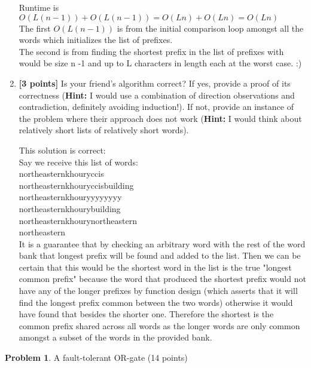 \documentclass[11pt]{article}
\theoremstyle{definition}
\theoremstyle{theorem}
\newtheorem{prob}{Problem}
\newcommand{\solution}{\medskip\noindent{\color{DarkBlue}\textbf{Solution:}}}
\begin{document}
\begin{enumerate}[label=(\alph*)]
\solution

Runtime is $O(L(n-1)) + O(L(n-1)) = O(Ln) + O(Ln) = O(Ln)$ \\
The first $O(L(n-1))$ is from the initial comparison loop amongst all the words which initializes the list of prefixes. \\
The second is from finding the shortest prefix in the list of prefixes with would be size n -1 and up to L characters in length each at the worst case. :)
 

\item \textbf{[3 points]} Is your friend's algorithm correct? If yes, provide a proof of its correctness (\textbf{Hint:} I would use a combination of direction observations and contradiction, definitely avoiding induction!). If not, provide an instance of the problem where their approach does not work (\textbf{Hint:} I would think about relatively short lists of relatively short words).

\solution


This solution is correct: \\

Say we receive this list of words: \\
northeasternkhouryccis\\
northeasternkhouryccisbuilding\\
northeasternkhouryyyyyyyy\\
northeasternkhourybuilding\\
northeasternkhourynortheastern\\
northeastern \\

It is a guarantee that by checking an arbitrary word with the rest of the word bank that longest prefix will be found and added to the list. Then we can be certain that this would be the shortest word in the list is the true "longest common prefix" because the word that produced the shortest prefix would not have any of the longer prefixes by function design (which asserts that it will find the longest prefix common between the two words) otherwise it would have found that besides the shorter one. Therefore the shortest is the common prefix shared across all words as the longer words are only common amongst a subset of the words in the provided bank.

\end{enumerate}

\newpage

\begin{prob} A fault-tolerant OR-gate (14 points) \end{prob}
\end{document}
